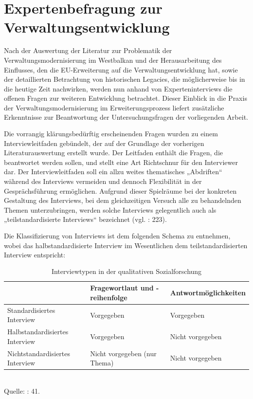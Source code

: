 \chapter{Expertenbefragung zur Verwaltungsentwicklung}
Nach der Auswertung der Literatur zur Problematik der Verwaltungsmodernisierung im Westbalkan und der Herausarbeitung des Einflusses, den die EU-Erweiterung auf die Verwaltungsentwicklung hat, sowie der detaillierten Betrachtung von historischen Legacies, die möglicherweise bis in die heutige Zeit nachwirken, werden nun anhand von Experteninterviews die offenen Fragen zur weiteren Entwicklung betrachtet. Dieser Einblick in die Praxis der Verwaltungsmodernisierung im Erweiterungsprozess liefert zusätzliche Erkenntnisse zur Beantwortung der Untersuchungsfragen der vorliegenden Arbeit.\par
Die vorrangig klärungsbedürftig erscheinenden Fragen wurden zu einem Interviewleitfaden gebündelt, der auf der Grundlage der vorherigen Literaturauswertung erstellt wurde. Der Leitfaden enthält die Fragen, die beantwortet werden sollen, und stellt eine Art Richtschnur für den Interviewer dar. Der Interviewleitfaden soll ein allzu weites thematisches „Abdriften“ während des Interviews vermeiden und dennoch Flexibilität in der Gesprächsführung ermöglichen. Aufgrund dieser Spielräume bei der konkreten Gestaltung des Interviews, bei dem gleichzeitigen Versuch alle zu behandelnden Themen unterzubringen, werden solche Interviews gelegentlich auch als „teilstandardisierte Interviews“ bezeichnet (vgl. \cite{flick10} : 223).\par
Die Klassifizierung von Interviews ist dem folgenden Schema zu entnehmen, wobei das halbstandardisierte Interview im Wesentlichen dem teilstandardisierten Interview entspricht:

\begin{table}[H]
\caption[Interviewtypen in der qualitativen Sozialforschung]{Interviewtypen in der qualitativen Sozialforschung}
\center
\scriptsize{
\begin{tabular}{|L{40mm}|L{40mm}|L{40mm}|}\hline
&Fragewortlaut und -reihenfolge&Antwortmöglichkeiten\\\hline
Standardisiertes Interview&
Vorgegeben&
Vorgegeben\\\hline
Halbstandardisiertes Interview&
Vorgegeben&
Nicht vorgegeben\\\hline
Nichtstandardisiertes Interview&
Nicht vorgegeben (nur Thema)&
Nicht vorgegeben\\\hline
\end{tabular}\\
\vspace{0,5cm}
Quelle: \cite{glalau10} : 41. 
}
\end{table}
 
